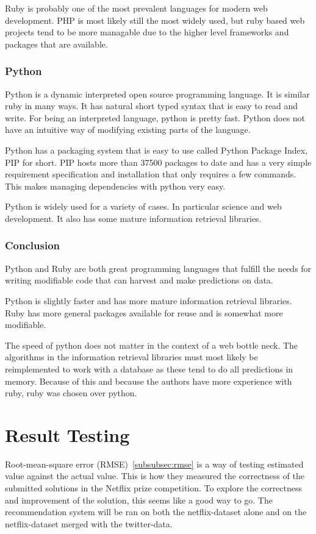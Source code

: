 Ruby is probably one of the most prevalent languages for modern web development. PHP is most likely still the most widely used, but ruby based web projects tend to be more managable due to the higher level frameworks and packages that are available.

\subsubsection{Python}
Python is a dynamic interpreted open source programming language. It is similar ruby in many ways. It has natural short typed syntax that is easy to read and write. For being an interpreted language, python is pretty fast. Python does not have an intuitive way of modifying existing parts of the language.\cite{python-about}

Python has a packaging system that is easy to use called Python Package Index, PIP for short. PIP hosts more than 37500 packages to date and has a very simple requirement specification and installation that only requires a few commands. This makes managing dependencies with python very easy.\cite{pip}

Python is widely used for a variety of cases. In particular science and web development. It also has some mature information retrieval libraries.

\subsubsection{Conclusion}
Python and Ruby are both great programming languages that fulfill the needs for writing modifiable code that can harvest and make predictions on data.

Python is slightly faster and has more mature information retrieval libraries. Ruby has more general packages available for reuse and is somewhat more modifiable.

The speed of python does not matter in the context of a web bottle neck. The algorithms in the information retrieval libraries must most likely be reimplemented to work with a database as these tend to do all predictions in memory. Because of this and because the authors have more experience with ruby, ruby was chosen over python.


\section{Result Testing}
Root-mean-square error (RMSE)~\ref{subsubsec:rmse} is a way of testing estimated value against the actual value. This is how they measured the correctness of the submitted solutions in the Netflix prize competition. To explore the correctness and improvement of the solution, this seems like a good way to go. The recommendation system will be ran on both the netflix-dataset alone and on the netflix-dataset merged with the twitter-data.

